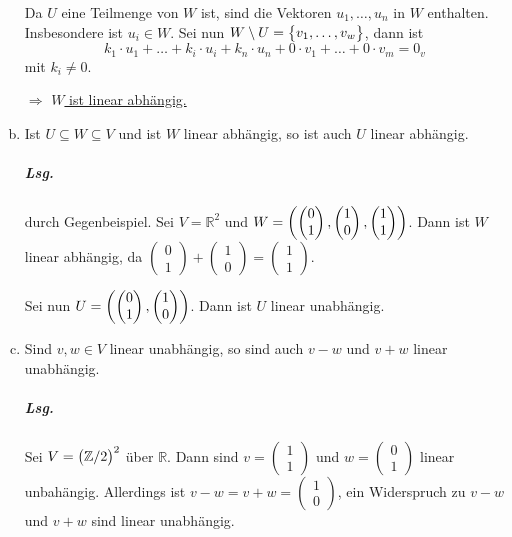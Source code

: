 \documentclass{scrreprt}
\begin{document}
\begin{enumerate}[(a)]
  Da $U$ eine Teilmenge von $W$ ist, sind  die Vektoren
  $u_1, \ldots, u_n$ in $W$ enthalten.
  Insbesondere ist $u_i \in W$.
  Sei nun $W \setminus U = \qty\big{v_1, \ldots, v_w}$, dann ist
  \[
    k_1 \cdot u_1 + \ldots + k_i \cdot u_i + k_n \cdot u_n + 0 \cdot v_1 +
    \ldots + 0 \cdot v_m = 0_v
  \]
  mit $k_i \ne 0$.

  $\Rightarrow$ \underline{$W$ ist linear abhängig.}

\item Ist $U \subseteq W \subseteq V$ und ist $W$ linear abhängig, so ist auch
  $U$ linear abhängig.

  \subparagraph{Lsg.} durch Gegenbeispiel.
  Sei $V = \mathbb{R}^2$ und $W = \qty(\begin{pmatrix} 0 \\ 1 \end{pmatrix},
  \begin{pmatrix} 1 \\ 0 \end{pmatrix}, \begin{pmatrix} 1 \\ 1 \end{pmatrix})$.
  Dann ist $W$ linear abhängig, da $\begin{pmatrix} 0 \\ 1 \end{pmatrix} +
  \begin{pmatrix} 1 \\ 0 \end{pmatrix} = \begin{pmatrix} 1 \\ 1 \end{pmatrix}$.

  Sei nun $U = \qty(\begin{pmatrix} 0 \\ 1 \end{pmatrix},
  \begin{pmatrix} 1 \\ 0 \end{pmatrix})$.
  Dann ist $U$ linear unabhängig.

\item Sind $v, w \in V$ linear unabhängig, so sind auch $v - w$ und $v + w$
  linear unabhängig.

  \subparagraph{Lsg.} Sei $V = \qty\big(\mathbb{Z}/2)^2$ über $\mathbb{R}$.
  Dann sind $v = \begin{pmatrix} 1 \\ 1 \end{pmatrix}$ und
  $w = \begin{pmatrix} 0 \\ 1 \end{pmatrix}$
  linear unbahängig.
  Allerdings ist $v - w = v + w = \begin{pmatrix} 1 \\ 0 \end{pmatrix}$, ein
  Widerspruch zu $v - w$ und $v + w$ sind linear unabhängig.
\end{enumerate}
\end{document}
